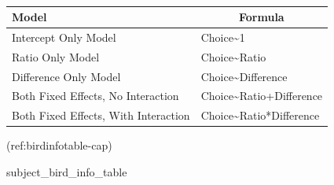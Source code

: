 \documentclass[
]{article}
\newenvironment{Shaded}{\begin{snugshade}}{\end{snugshade}}
\newcommand{\NormalTok}[1]{#1}
\begin{document}
\begin{table}[tbp]

\begin{center}
\begin{threeparttable}

\caption{\label{tab:unnamed-chunk-1}}

\begin{tabular}{ll}
\toprule
Model & \multicolumn{1}{c}{Formula}\\
\midrule
Intercept Only Model & Choice\textasciitilde{}1\\
Ratio Only Model & Choice\textasciitilde{}Ratio\\
Difference Only Model & Choice\textasciitilde{}Difference\\
Both Fixed Effects, No Interaction & Choice\textasciitilde{}Ratio+Difference\\
Both Fixed Effects, With Interaction & Choice\textasciitilde{}Ratio*Difference\\
\bottomrule
\end{tabular}

\end{threeparttable}
\end{center}

\end{table}

(ref:birdinfotable-cap)

\begin{Shaded}
\begin{Highlighting}[]
\NormalTok{subject\_bird\_info\_table}
\end{Highlighting}
\end{Shaded}
\end{document}
